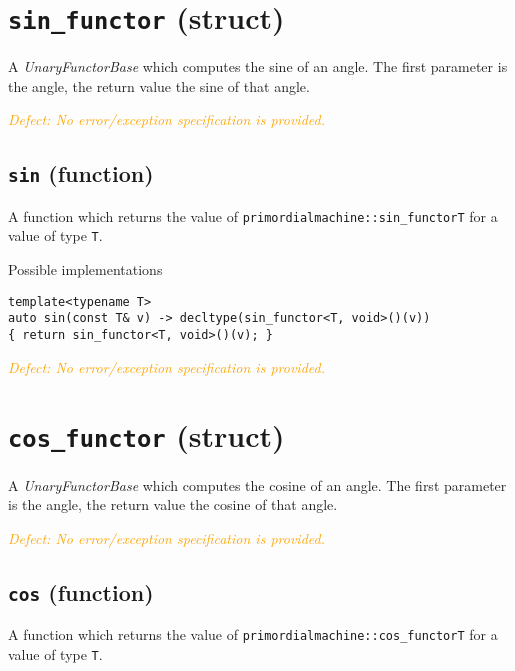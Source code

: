 \documentclass[oneside]{book}
\begin{document}


\section{\texttt{sin\_functor} (struct)}
A \textit{UnaryFunctorBase} which computes the
sine
of an angle.
The first parameter is the angle, the return value the sine of that angle.


\noindent{}\textcolor{orange}{\textit{Defect: No error/exception specification is provided.}}

\subsection{\texttt{sin} (function)}
A function which returns the value of \texttt{primordialmachine::sin\_functor\textlangle T\textrangle}
for a value of type \texttt{T}.

\noindent{}Possible implementations
\begin{verbatim}
template<typename T>
auto sin(const T& v) -> decltype(sin_functor<T, void>()(v))
{ return sin_functor<T, void>()(v); }
\end{verbatim}

\noindent{}\textcolor{orange}{\textit{Defect: No error/exception specification is provided.}}

\section{\texttt{cos\_functor} (struct)}
A \textit{UnaryFunctorBase} which computes the
cosine
of an angle.
The first parameter is the angle, the return value the cosine of that angle.

\noindent{}\textcolor{orange}{\textit{Defect: No error/exception specification is provided.}}

\subsection{\texttt{cos} (function)}
A function which returns the value of \texttt{primordialmachine::cos\_functor\textlangle T\textrangle}
for a value of type \texttt{T}.
\end{document}
